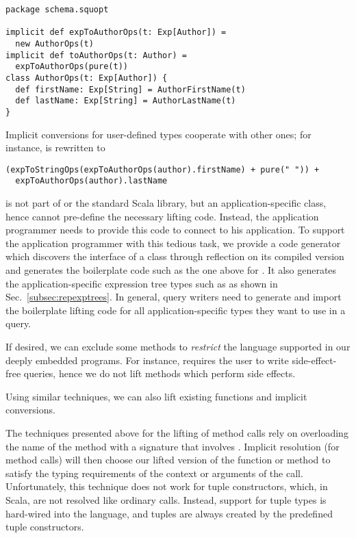 \begin{lstlisting}
package schema.squopt

implicit def expToAuthorOps(t: Exp[Author]) =
  new AuthorOps(t)
implicit def toAuthorOps(t: Author) =
  expToAuthorOps(pure(t))
class AuthorOps(t: Exp[Author]) {
  def firstName: Exp[String] = AuthorFirstName(t)
  def lastName: Exp[String] = AuthorLastName(t)
}
\end{lstlisting}

Implicit conversions for user-defined types cooperate with other ones; for instance,  is rewritten to
\begin{lstlisting}
(expToStringOps(expToAuthorOps(author).firstName) + pure(" ")) +
  expToAuthorOps(author).lastName
\end{lstlisting}

 is not part of {\LoS} or the standard Scala library, but an application-specific class, hence {\LoS} cannot
pre-define the necessary lifting code. Instead, the application programmer needs
to provide this code to connect {\LoS} to his application. To support the
application programmer with this tedious task, we provide a code generator which
discovers the interface of a class through reflection on its compiled version
and generates the boilerplate code such as the one above for . It
also generates
the application-specific expression tree types such as  as shown in Sec.~\ref{subsec:repexptrees}.
In general, query writers need to generate and import the boilerplate lifting code for all application-specific types they want to use in a {\LoS} query.

If desired, we can exclude some methods to \emph{restrict} the language supported in our deeply embedded programs. For instance, \LoS{} requires the user to write side-effect-free queries, hence we do not lift methods which perform side effects.

Using similar techniques, we can also lift existing functions and implicit conversions.



The techniques presented above for the lifting of method calls rely on overloading the name of the method with a signature that involves . Implicit resolution (for method calls) will then choose our lifted version of the function or method to satisfy the typing requirements of the context or arguments of the call. Unfortunately, this technique does not work for tuple constructors, which, in Scala, are not resolved like ordinary calls. Instead, support for tuple types is hard-wired into the language, and tuples are always created by the predefined tuple constructors.

